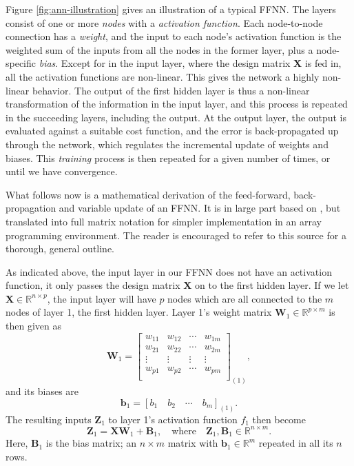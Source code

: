 \documentclass[]{article}
\begin{document}
Figure \ref{fig:ann-illustration} gives an illustration of a typical FFNN. The layers consist of one or more \textit{nodes} with a \textit{activation function}. Each node-to-node connection has a \textit{weight}, and the input to each node's activation function is the weighted sum of the inputs from all the nodes in the former layer, plus a node-specific \textit{bias}. Except for in the input layer, where the design matrix $\mathbf{X}$ is fed in, all the activation functions are non-linear. This gives the network a highly non-linear behavior. The output of the first hidden layer is thus a non-linear transformation of the information in the input layer, and this process is repeated in the succeeding layers, including the output. At the output layer, the output is evaluated against a suitable cost function, and the error is back-propagated up through the network, which regulates the incremental update of weights and biases. This \textit{training} process is then repeated for a given number of times, or until we have convergence.

\vspace{5mm}

What follows now is a mathematical derivation of the feed-forward, back-propagation and variable update of an FFNN. It is in large part based on \cite{fys-stk4155-notes}, but translated into full matrix notation for simpler implementation in an array programming environment. The reader is encouraged to refer to this source for a thorough, general outline.

As indicated above, the input layer in our FFNN does not have an activation function, it only passes the design matrix $\mathbf{X}$ on to the first hidden layer. If we let $\mathbf{X} \in \mathbb{R}^{n \times p}$, the input layer will have $p$ nodes which are all connected to the $m$ nodes of layer 1, the first hidden layer. Layer 1's weight matrix $\mathbf{W}_1 \in \mathbb{R}^{p \times m}$ is then given as
\begin{equation}
	\mathbf{W}_1 = 
	\left[\begin{array}{cccc}
		w_{11} &w_{12} & \cdots &w_{1m} \\
		w_{21} &w_{22} & \cdots &w_{2m} \\
		\vdots &\vdots &\vdots  &\vdots \\ 
		w_{p1} &w_{p2} & \cdots &w_{pm} \\
	\end{array} \right]_{(1)},
\end{equation} 
and its biases are
\begin{equation}
	\mathbf{b}_1 = [b_1 \quad b_2 \quad \cdots \quad b_m]_{(1)}.
\end{equation}
The resulting inputs $\mathbf{Z}_1$ to layer 1's activation function $f_1$ then become
\begin{equation} \label{inputs}
	\mathbf{Z}_1 = \mathbf{X} \mathbf{W}_1 + \mathbf{B}_1, \quad \text{where} \quad \mathbf{Z}_1, \mathbf{B}_1 \in \mathbb{R}^{n \times m}.
\end{equation}
Here, $\mathbf{B}_1$ is the bias matrix; an $n \times m$ matrix with $\mathbf{b}_1 \in \mathbb{R}^m$ repeated in all its $n$ rows.
\end{document}

